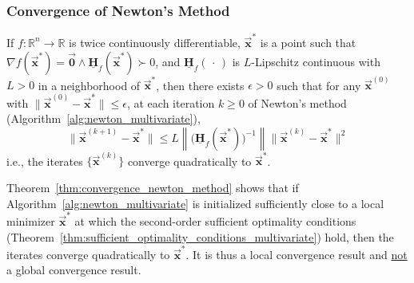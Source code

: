 \documentclass[9pt, headings=standardclasses, parskip=half]{scrartcl}
\renewcommand{\emph}[1]{\textcolor{mypurple}{#1}}
\newcommand{\matr}[1]{\underline{\boldsymbol{#1}}}
\newcommand{\vect}[1]{\vec{\boldsymbol{#1}}}
\begin{document}
\subsubsection{Convergence of Newton's Method}
\label{subsubsec:newton_convergence}

\begin{theorem}\label{thm:convergence_newton_method}
If \(f:\mathbb{R}^{n}\to\mathbb{R}\) is twice continuously differentiable, 
\(\vect{x}^{*}\) is a point such that \(\nabla f(\vect{x}^{*}) = \vect{0} \wedge \matr{H}_{f}(\vect{x}^{*}) \succ 0\),
and \(\matr{H}_{f}(\,\cdot \,)\) is \(L\)-Lipschitz continuous with \(L>0\) in a neighborhood of \(\vect{x}^{*}\),
then there exists \(\epsilon>0\) such that for any \(\vect{x}^{(0)}\) with \(\|\vect{x}^{(0)}-\vect{x}^{*}\| \leq \epsilon\), 
at each iteration \(k \geq 0\) of Newton's method (Algorithm~\ref{alg:newton_multivariate}), 
\begin{equation}
\label{eq:convergence_newton_method}
\big\|\vect{x}^{(k+1)}-\vect{x}^{*}\big\| \leq L\left\|\big(\matr{H}_{f}(\vect{x}^{*})\big)^{-1}\right\| \big\|\vect{x}^{(k)}-\vect{x}^{*}\big\|^{2} %
\end{equation}
i.e., the iterates \(\{\vect{x}^{(k)}\}\) converge quadratically to \(\vect{x}^{*}\).
\end{theorem}

\begin{remark}
Theorem~\ref{thm:convergence_newton_method} shows that if Algorithm~\ref{alg:newton_multivariate} is initialized sufficiently close to a local minimizer \(\vect{x}^{*}\) at which the second-order sufficient optimality conditions (Theorem~\ref{thm:sufficient_optimality_conditions_multivariate}) hold, then the iterates converge quadratically to \(\vect{x}^{*}\).
It is thus a \emph{local convergence} result and \underline{not} a global convergence result.
\end{remark}
\end{document}
